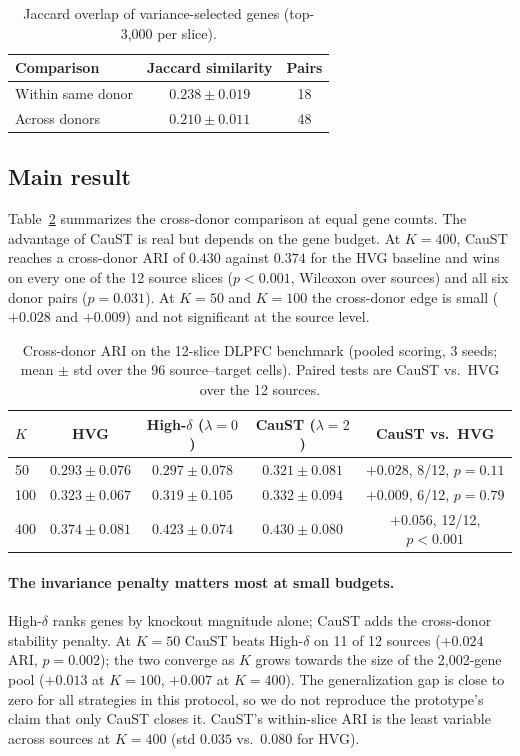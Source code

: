\documentclass[11pt]{article}
\begin{document}
\begin{table}[t]
\centering
\caption{Jaccard overlap of variance-selected genes (top-3{,}000 per slice).}
\label{tab:jaccard}
\begin{tabular}{lcc}
\toprule
Comparison & Jaccard similarity & Pairs \\
\midrule
Within same donor & $0.238 \pm 0.019$ & 18 \\
Across donors & $0.210 \pm 0.011$ & 48 \\
\bottomrule
\end{tabular}
\end{table}

\subsection{Main result}
Table~\ref{tab:main} summarizes the cross-donor comparison at equal gene counts.
The advantage of CauST is real but depends on the gene budget. At $K=400$,
CauST reaches a cross-donor ARI of $0.430$ against $0.374$ for the HVG baseline
and wins on every one of the 12 source slices ($p<0.001$, Wilcoxon over
sources) and all six donor pairs ($p=0.031$). At $K=50$ and $K=100$ the
cross-donor edge is small ($+0.028$ and $+0.009$) and not significant at the
source level.

\begin{table}[t]
\centering
\caption{Cross-donor ARI on the 12-slice DLPFC benchmark (pooled scoring, 3
seeds; mean $\pm$ std over the 96 source--target cells). Paired tests are
CauST vs.\ HVG over the 12 sources.}
\label{tab:main}
\begin{tabular}{lcccc}
\toprule
$K$ & HVG & High-$\delta$ ($\lambda=0$) & CauST ($\lambda=2$) & CauST vs.\ HVG \\
\midrule
50  & $0.293 \pm 0.076$ & $0.297 \pm 0.078$ & $\mathbf{0.321 \pm 0.081}$ & $+0.028$, 8/12, $p=0.11$ \\
100 & $0.323 \pm 0.067$ & $0.319 \pm 0.105$ & $\mathbf{0.332 \pm 0.094}$ & $+0.009$, 6/12, $p=0.79$ \\
400 & $0.374 \pm 0.081$ & $0.423 \pm 0.074$ & $\mathbf{0.430 \pm 0.080}$ & $\mathbf{+0.056}$, 12/12, $p<0.001$ \\
\bottomrule
\end{tabular}
\end{table}

\paragraph{The invariance penalty matters most at small budgets.}
High-$\delta$ ranks genes by knockout magnitude alone; CauST adds the
cross-donor stability penalty. At $K=50$ CauST beats High-$\delta$ on 11 of 12
sources ($+0.024$ ARI, $p=0.002$); the two converge as $K$ grows towards the
size of the 2{,}002-gene pool ($+0.013$ at $K=100$, $+0.007$ at $K=400$). The
generalization gap is close to zero for all strategies in this protocol, so we
do not reproduce the prototype's claim that only CauST closes it. CauST's
within-slice ARI is the least variable across sources at $K=400$ (std $0.035$
vs.\ $0.080$ for HVG).
\end{document}
